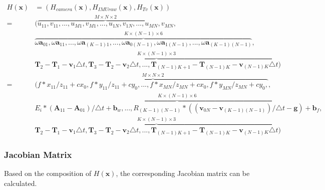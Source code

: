 \documentclass[12pt]{article}   %
\begin{document}
\begin{appendices}
\begin{align} %
H(\textbf{x}) &= (H_{camera}(\textbf{x}), H_{IMUraw}(\textbf{x}), H_{Tv}(\textbf{x})) \nonumber \\
=& (\overbrace{{u}_{11}, {v}_{11}, ... , {u}_{M1}, {v}_{M1}, ..., {u}_{1N}, {v}_{1N}, ... , {u}_{MN}, {v}_{MN}}^{M \times N \times 2}, \nonumber \\ 
& \overbrace{\omega\textbf{a}_{01}, \omega\textbf{a}_{11}, ... , \omega\textbf{a}_{(K-1)1}, ..., \omega\textbf{a}_{0(N-1)}, \omega\textbf{a}_{1(N-1)}, ... , \omega\textbf{a}_{(K-1)(N-1)}}^{K \times (N-1) \times 6}, \nonumber \\
& \overbrace{\textbf{T}_2 - \textbf{T}_{1} - \textbf{v}_{1} \triangle t, \textbf{T}_{3} - \textbf{T}_{2} - \textbf{v}_{2} \triangle t, ... , \textbf{T}_{(N-1)K+1} - \textbf{T}_{(N-1)K} - \textbf{v}_{(N-1)K} \triangle t}^{K \times (N-1) \times 3}) \nonumber \\
=& (\overbrace{f * x_{11} / z_{11} + cx_0, f * y_{11} / z_{11} + cy_0, ... , f * x_{MN} / z_{MN} + cx_0, f * y_{MN} / z_{MN} + cy_0, }^{M \times N \times 2}, \nonumber \\ 
& \overbrace{E_i*(\textbf{A}_{11} - \textbf{A}_{01})/\triangle t + \textbf{b}_w, ..., R_{(K-1)(N-1)} * ((\textbf{v}_{0N} - \textbf{v}_{(K-1)(N-1)}) / \triangle t - \textbf{g}) + \textbf{b}_f}^{K \times (N-1) \times 6}, \nonumber \\
& \overbrace{\textbf{T}_2 - \textbf{T}_{1} - \textbf{v}_{1} \triangle t, \textbf{T}_{3} - \textbf{T}_{2} - \textbf{v}_{2} \triangle t, ... , \textbf{T}_{(N-1)K+1} - \textbf{T}_{(N-1)K} - \textbf{v}_{(N-1)K} \triangle t}^{K \times (N-1) \times 3}) 
\end{align}

\subsubsection{Jacobian Matrix}

Based on the composition of $H(\textbf{x})$, the corresponding Jacobian matrix can be calculated. 


\end{appendices}
\end{document}
